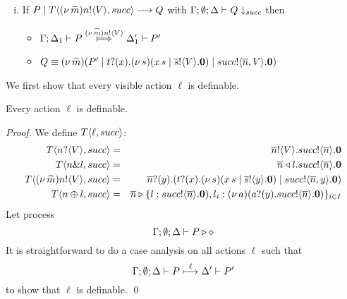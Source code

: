 \begin{definition}[Definability]
\begin{enumerate}
\begin{enumerate}[i.]
				\item	If $P \;|\; T\langle (\nu\, \widetilde{m})n ! \langle V \rangle, succ \rangle \longrightarrow Q$
						with $\Gamma; \emptyset; \Delta \vdash Q \downarrow_{succ}$ then 
						\begin{itemize}
							\item $\horel{\Gamma}{\Delta_1}{P}{\Hby{\news{\widetilde{m}}\bactout{n}{V}}}{\Delta_1'}{P'}$
							\item $Q \equiv (\nu\, \widetilde{m})(P' \;|\; t ? (x) . (\nu\, s)(x\, {s} \;|\; \overline{s} ! \langle V \rangle . \mathbf{0}) \;|\; succ ! \langle \overline{n}, V \rangle . \mathbf{0})$
						\end{itemize}
			\end{enumerate}
	\end{enumerate}	
%
\end{definition}

We first show that every visible action $\ell$ is definable.

\begin{lemma}[Definability]
	\label{lem:definibility}
	Every action $\ell$ is definable.
\end{lemma}

\begin{proof}
	\noi We define $T\langle \ell, succ \rangle$:
	\begin{eqnarray*}
		T\langle n ? \langle V \rangle, succ \rangle &=&
		\overline{n} ! \langle V \rangle . succ ! \langle \overline{n} \rangle . \mathbf{0}
		\\
		T\langle n \& l, succ \rangle &=&
		\overline{n} \triangleleft l . succ ! \langle \overline{n} \rangle . \mathbf{0}
		\\
		T\langle (\nu\, \widetilde{m}) n ! \langle V \rangle, succ \rangle &=&
		\overline{n} ? (y) . (t ? (x) . (\nu\, s)(x\, {s} \;|\; \overline{s} ! \langle y \rangle . \mathbf{0}) \;|\; succ ! \langle \overline{n}, y \rangle . \mathbf{0})
		\\
		T\langle n \oplus l, succ \rangle &=&
		\overline{n} \triangleright \{l: succ ! \langle \overline{n} \rangle . \mathbf{0}), l_i: (\nu\, a)(a ? (y) . succ ! \langle \overline{n} \rangle . \mathbf{0})\}_{i \in I}
	\end{eqnarray*}
%		
	\noi Let process 
	\[
		\Gamma; \emptyset; \Delta \vdash P \triangleright \diamond
	\]
	\noi	It is straightforward to do a case analysis
			on all actions $\ell$ such that
			\[
				\Gamma; \emptyset; \Delta \vdash P \stackrel{\ell}{\longmapsto} \Delta' \vdash P'
			\]
			to show that $\ell$ is definable.
	\qed
\end{proof}

